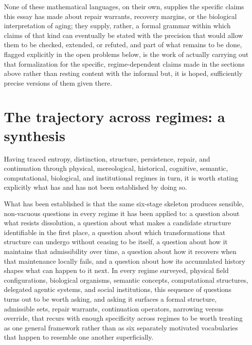 \documentclass[11pt]{article}
\begin{document}
None of these mathematical languages, on their own, supplies the specific claims this essay has made about repair warrants, recovery margins, or the biological interpretation of aging; they supply, rather, a formal grammar within which claims of that kind can eventually be stated with the precision that would allow them to be checked, extended, or refuted, and part of what remains to be done, flagged explicitly in the open problems below, is the work of actually carrying out that formalization for the specific, regime-dependent claims made in the sections above rather than resting content with the informal but, it is hoped, sufficiently precise versions of them given there.

\section{The trajectory across regimes: a synthesis}

Having traced entropy, distinction, structure, persistence, repair, and continuation through physical, mereological, historical, cognitive, semantic, computational, biological, and institutional regimes in turn, it is worth stating explicitly what has and has not been established by doing so.

What has been established is that the same six-stage skeleton produces sensible, non-vacuous questions in every regime it has been applied to: a question about what resists dissolution, a question about what makes a candidate structure identifiable in the first place, a question about which transformations that structure can undergo without ceasing to be itself, a question about how it maintains that admissibility over time, a question about how it recovers when that maintenance locally fails, and a question about how its accumulated history shapes what can happen to it next. In every regime surveyed, physical field configurations, biological organisms, semantic concepts, computational structures, delegated agentic systems, and social institutions, this sequence of questions turns out to be worth asking, and asking it surfaces a formal structure, admissible sets, repair warrants, continuation operators, narrowing versus override, that recurs with enough specificity across regimes to be worth treating as one general framework rather than as six separately motivated vocabularies that happen to resemble one another superficially.
\end{document}
